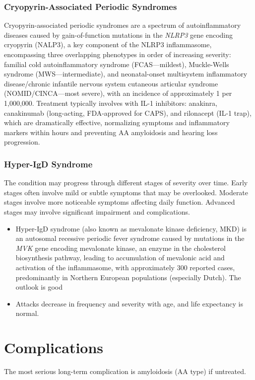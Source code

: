 \subsubsection{Cryopyrin-Associated Periodic Syndromes}
Cryopyrin-associated periodic syndromes are a spectrum of autoinflammatory diseases caused by gain-of-function mutations in the \textit{NLRP3} gene encoding cryopyrin (NALP3), a key component of the NLRP3 inflammasome, encompassing three overlapping phenotypes in order of increasing severity: familial cold autoinflammatory syndrome (FCAS---mildest), Muckle-Wells syndrome (MWS---intermediate), and neonatal-onset multisystem inflammatory disease/chronic infantile nervous system cutaneous articular syndrome (NOMID/CINCA---most severe), with an incidence of approximately 1 per 1,000,000. Treatment typically involves with IL-1 inhibitors: anakinra, canakinumab (long-acting, FDA-approved for CAPS), and rilonacept (IL-1 trap), which are dramatically effective, normalizing symptoms and inflammatory markers within hours and preventing AA amyloidosis and hearing loss progression.

\subsubsection{Hyper-IgD Syndrome} The condition may progress through different stages of severity over time. Early stages often involve mild or subtle symptoms that may be overlooked. Moderate stages involve more noticeable symptoms affecting daily function. Advanced stages may involve significant impairment and complications.

\begin{itemize}[noitemsep]
  \item Hyper-IgD syndrome (also known as mevalonate kinase deficiency, MKD) is an autosomal recessive periodic fever syndrome caused by mutations in the \textit{MVK} gene encoding mevalonate kinase, an enzyme in the cholesterol biosynthesis pathway, leading to accumulation of mevalonic acid and activation of the inflammasome, with approximately 300 reported cases, predominantly in Northern European populations (especially Dutch). The outlook is good
  \item Attacks decrease in frequency and severity with age, and life expectancy is normal.
\end{itemize}
\section{Complications}
The most serious long-term complication is amyloidosis (AA type) if untreated.

